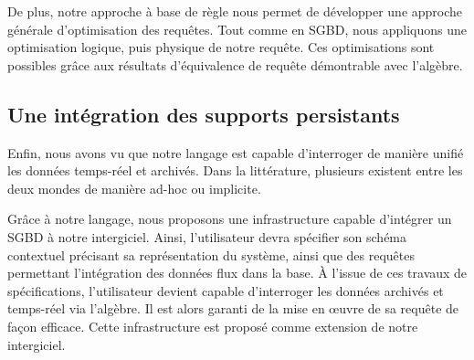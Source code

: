De plus, notre approche à base de règle nous permet de développer une approche générale d'optimisation des requêtes. Tout comme en SGBD, nous appliquons une optimisation logique, puis physique de notre requête. Ces optimisations sont possibles grâce aux résultats d'équivalence de requête démontrable avec l'algèbre.

\subsection{Une intégration des supports persistants}
Enfin, nous avons vu que notre langage est capable d'interroger de manière unifié les données temps-réel et archivés. Dans la littérature, plusieurs existent entre les deux mondes de manière ad-hoc ou implicite.

Grâce à notre langage, nous proposons une infrastructure capable d'intégrer un SGBD à notre intergiciel. Ainsi, l'utilisateur devra spécifier son schéma contextuel précisant sa représentation du système, ainsi que des requêtes permettant l'intégration des données flux dans la base. À l'issue de ces travaux de spécifications, l'utilisateur devient capable d'interroger les données archivés et temps-réel via l'algèbre. Il est alors garanti de la mise en œuvre de sa requête de façon efficace. Cette infrastructure est proposé comme extension de notre intergiciel.
